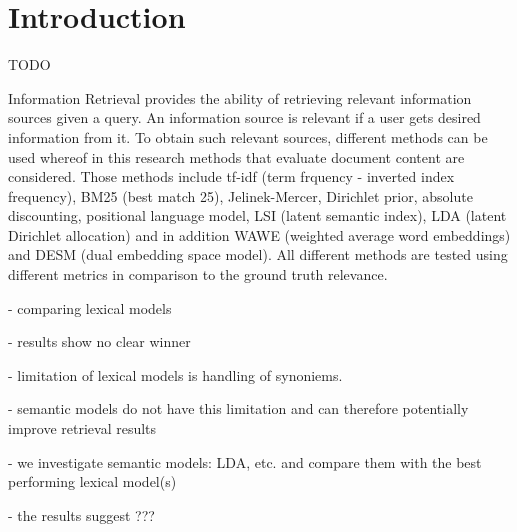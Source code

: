 \section{Introduction}

TODO

Information Retrieval provides the ability of retrieving relevant information sources given a query. An information source is relevant if a user gets desired information from it. To obtain such relevant sources, different methods can be used whereof in this research methods that evaluate document content are considered. Those methods include tf-idf (term frquency - inverted index frequency), BM25 (best match 25), Jelinek-Mercer, Dirichlet prior, absolute discounting, positional language model, LSI (latent semantic index), LDA (latent Dirichlet allocation) and in addition WAWE (weighted average word embeddings) and DESM (dual embedding space model). All different methods are tested using different metrics in comparison to the ground truth relevance.


- comparing lexical models

- results show no clear winner



- limitation of lexical models is handling of synoniems.

- semantic models do not have this limitation and can 
therefore potentially improve retrieval results

- we investigate semantic models: LDA, etc. and compare them
with the best performing lexical model(s)

- the results suggest ???

